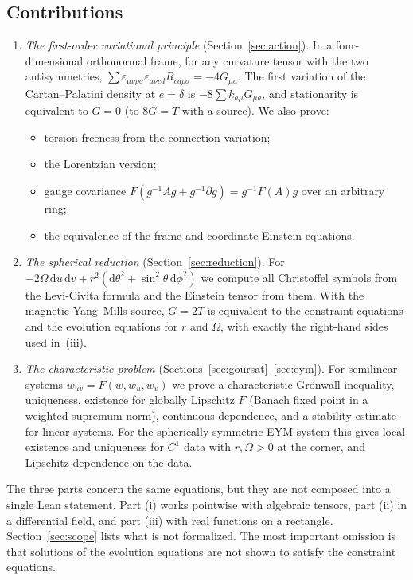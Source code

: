 \documentclass[11pt]{amsart}
\theoremstyle{definition}
\theoremstyle{remark}
\newcommand{\dd}{\mathrm{d}}
\begin{document}
\subsection*{Contributions}
\begin{enumerate}[label=(\roman*)]
\item \emph{The first-order variational principle} (Section~\ref{sec:action}). In a four-dimensional orthonormal frame, for any curvature tensor with the two antisymmetries, $\sum\varepsilon_{\mu\nu\rho\sigma}\varepsilon_{a\nu cd}R_{cd\rho\sigma}=-4G_{\mu a}$. The first variation of the Cartan--Palatini density at $e=\delta$ is $-8\sum k_{a\mu}G_{\mu a}$, and stationarity is equivalent to $G=0$ (to $8G=T$ with a source). We also prove:
  \begin{itemize}
  \item torsion-freeness from the connection variation;
  \item the Lorentzian version;
  \item gauge covariance $F(g^{-1}Ag+g^{-1}\partial g)=g^{-1}F(A)g$ over an arbitrary ring;
  \item the equivalence of the frame and coordinate Einstein equations.
  \end{itemize}
\item \emph{The spherical reduction} (Section~\ref{sec:reduction}). For $-2\Omega\,\dd u\,\dd v+r^2(\dd\theta^2+\sin^2\theta\,\dd\phi^2)$ we compute all Christoffel symbols from the Levi-Civita formula and the Einstein tensor from them. With the magnetic Yang--Mills source, $G=2T$ is equivalent to the constraint equations and the evolution equations for $r$ and $\Omega$, with exactly the right-hand sides used in~(iii).
\item \emph{The characteristic problem} (Sections~\ref{sec:goursat}--\ref{sec:eym}). For semilinear systems $w_{uv}=F(w,w_u,w_v)$ we prove a characteristic Gr\"onwall inequality, uniqueness, existence for globally Lipschitz $F$ (Banach fixed point in a weighted supremum norm), continuous dependence, and a stability estimate for linear systems. For the spherically symmetric EYM system this gives local existence and uniqueness for $C^1$ data with $r,\Omega>0$ at the corner, and Lipschitz dependence on the data.
\end{enumerate}

The three parts concern the same equations, but they are not composed into a single Lean statement. Part (i) works pointwise with algebraic tensors, part (ii) in a differential field, and part (iii) with real functions on a rectangle. Section~\ref{sec:scope} lists what is not formalized. The most important omission is that solutions of the evolution equations are not shown to satisfy the constraint equations.
\end{document}
